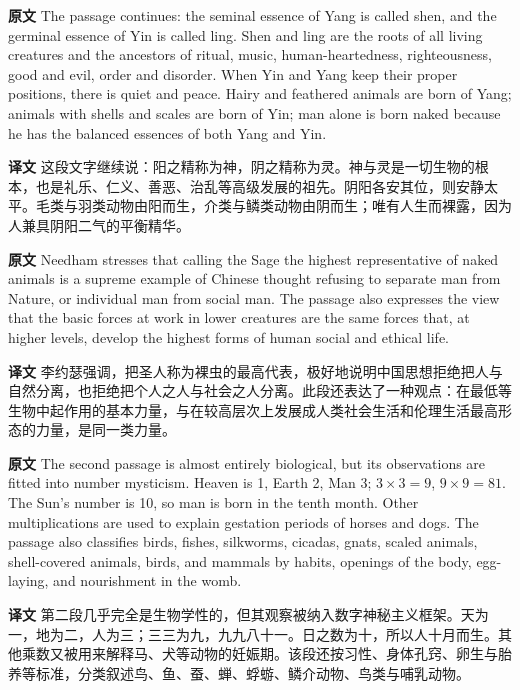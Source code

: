 \documentclass[UTF8,zihao=-4]{ctexart}
\newcommand{\BodyFont}{\fontsize{10.5pt}{15.5pt}\selectfont}
\newcommand{\origlabel}{\textbf{原文}\quad}
\newcommand{\translabel}{\textbf{译文}\quad}
\newenvironment{enblock}{\par\noindent\begingroup\BodyFont\origlabel}{\par\endgroup}
\newenvironment{zhblock}{\par\noindent\begingroup\BodyFont\translabel}{\par\endgroup\vspace{0.35em}}
\begin{document}
\begin{enblock}
The passage continues: the seminal essence of Yang is called shen, and the germinal essence of Yin is called ling. Shen and ling are the roots of all living creatures and the ancestors of ritual, music, human-heartedness, righteousness, good and evil, order and disorder. When Yin and Yang keep their proper positions, there is quiet and peace. Hairy and feathered animals are born of Yang; animals with shells and scales are born of Yin; man alone is born naked because he has the balanced essences of both Yang and Yin.
\end{enblock}
\begin{zhblock}
这段文字继续说：阳之精称为神，阴之精称为灵。神与灵是一切生物的根本，也是礼乐、仁义、善恶、治乱等高级发展的祖先。阴阳各安其位，则安静太平。毛类与羽类动物由阳而生，介类与鳞类动物由阴而生；唯有人生而裸露，因为人兼具阴阳二气的平衡精华。
\end{zhblock}

\begin{enblock}
Needham stresses that calling the Sage the highest representative of naked animals is a supreme example of Chinese thought refusing to separate man from Nature, or individual man from social man. The passage also expresses the view that the basic forces at work in lower creatures are the same forces that, at higher levels, develop the highest forms of human social and ethical life.
\end{enblock}
\begin{zhblock}
李约瑟强调，把圣人称为裸虫的最高代表，极好地说明中国思想拒绝把人与自然分离，也拒绝把个人之人与社会之人分离。此段还表达了一种观点：在最低等生物中起作用的基本力量，与在较高层次上发展成人类社会生活和伦理生活最高形态的力量，是同一类力量。
\end{zhblock}

\begin{enblock}
The second passage is almost entirely biological, but its observations are fitted into number mysticism. Heaven is 1, Earth 2, Man 3; \(3 \times 3 = 9\), \(9 \times 9 = 81\). The Sun's number is 10, so man is born in the tenth month. Other multiplications are used to explain gestation periods of horses and dogs. The passage also classifies birds, fishes, silkworms, cicadas, gnats, scaled animals, shell-covered animals, birds, and mammals by habits, openings of the body, egg-laying, and nourishment in the womb.
\end{enblock}
\begin{zhblock}
第二段几乎完全是生物学性的，但其观察被纳入数字神秘主义框架。天为一，地为二，人为三；三三为九，九九八十一。日之数为十，所以人十月而生。其他乘数又被用来解释马、犬等动物的妊娠期。该段还按习性、身体孔窍、卵生与胎养等标准，分类叙述鸟、鱼、蚕、蝉、蜉蝣、鳞介动物、鸟类与哺乳动物。
\end{zhblock}
\end{document}
